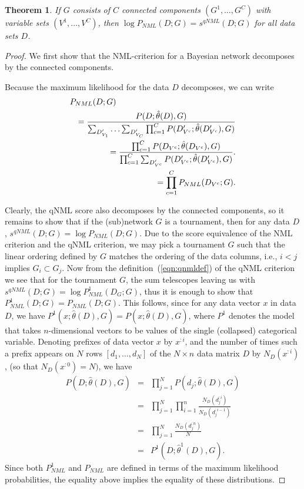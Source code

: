 \documentclass[12pt]{article}
\newtheorem{theorem}{Theorem}
\begin{document}
\begin{theorem}
If $G$ consists of $C$ connected components $(G^1,\ldots,G^C)$ with
variable sets $(V^1,\ldots,V^C)$, then $\log P_{NML}(D;G) = s^{qNML}(D;G)$
for all data sets $D$.
\end{theorem}
\begin{proof}
We first show that the NML-criterion for a Bayesian network
decomposes by the connected components.

Because the maximum likelihood for the data $D$ decomposes,
we can write
\begin{eqnarray}
  \lefteqn{P_{NML}(D;G)} \nonumber \\
  && = \frac{P(D;\hat\theta(D),G)}
            {\sum_{D'_{V_1}}\ldots \sum_{D'_{V_C}}\prod_{c=1}^C P(D'_{V^c};\hat\theta(D'_{V^c}),G)} \nonumber \\
            && = \frac{\prod_{c=1}^C P(D_{V^c};\hat\theta(D_{V^c}),G)} 
            {\prod_{c=1}^C\sum_{D'_{V^c}}P(D'_{V^c};\hat\theta(D'_{V^c}),G)}.\nonumber \\
            && = \prod_{c=1}^CP_{NML}(D_{V^c};G).
\end{eqnarray}

Clearly, the qNML score also decomposes by the connected components,
so it remains to show that if the (sub)network $G$ is a tournament,
then for any data $D$, $s^{qNML}(D;G)=\log P_{NML}(D;G)$.  Due to the
score equivalence of the NML criterion and the qNML criterion, we may
pick a tournament $G$ such that the linear ordering defined by $G$
matches the ordering of the data columns, i.e., $i<j$ implies $G_i
\subset G_j$. Now from the definition~(\ref{eqn:qnmldef}) of the qNML
criterion we see that for the tournament $G$, the sum telescopes
leaving us with $s^{qNML}(D;G) = \log P^1_{NML}(D_G;G)$, thus
it is enough to show that $P^1_{NML}(D;G)=P_{NML}(D;G)$.  This
follows, since for any data vector $x$ in data $D$, we have
$P^1(x;\hat\theta(D),G) = P(x;\hat\theta(D),G)$, where $P^1$ denotes
the model that takes $n$-dimensional vectors to be values of the
single (collapsed) categorical variable.  Denoting prefixes of data
vector $x$ by $x^{:i}$, and the number of times such a prefix appears
on $N$ rows $[d_1,\ldots,d_N]$ of the $N\times n$ data matrix $D$ by
$N_D(x^{:i})$, (so that $N_D(x^{:0})=N)$, we have
\begin{eqnarray}
  P(D;\hat\theta(D),G) &=& \prod_{j=1}^{N}P(d_j;\hat\theta(D),G) \nonumber \\
  &=& \prod_{j=1}^{N} \prod_{i=1}^{n} \frac{N_D(d_j^{:i})}{N_D(d_j^{:i-1})} \nonumber\\
  &=& \prod_{j=1}^{N} \frac{N_D(d_j^{:n})}{N} \nonumber \\
  &=& P^1(D;\hat\theta^1(D),G).
\end{eqnarray}
Since both $P^1_{NML}$ and $P_{NML}$ are defined in terms of the
maximum likelihood probabilities, the equality above implies the equality
of these distributions.
\end{proof}
\end{document}
